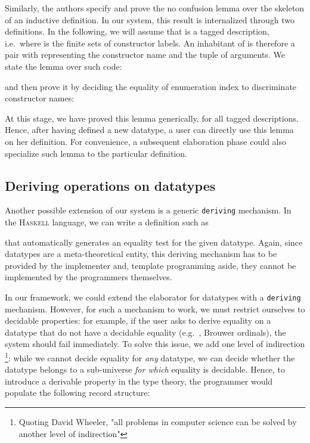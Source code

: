 \documentclass{scrartcl}
\theoremstyle{plain}
\theoremstyle{definition}
\newcommand{\ie}{i.e.\ }
\newcommand{\eg}{e.g.\ }
\begin{document}
Similarly, the authors specify and prove the no confusion lemma over
the skeleton of an inductive definition. In our system, this result is
internalized through two definitions. In the following, we will assume
that  is a tagged description, \ie  where  is the finite sets of constructor
labels. An inhabitant of  is therefore a pair
 with  representing the constructor name and
 the tuple of arguments. We state the  lemma over
such code:

and then prove it by deciding the equality of enumeration index to
discriminate constructor names:

At this stage, we have proved this lemma generically, for all tagged
descriptions. Hence, after having defined a new datatype, a user can
directly use this lemma on her definition. For convenience, a
subsequent elaboration phase could also specialize such lemma to the
particular definition.



\subsection{Deriving operations on datatypes}

Another possible extension of our system is a generic
\texttt{deriving} mechanism. In the \textsc{Haskell} language, we can
write a definition such as

that automatically generates an equality test for the given
datatype. Again, since datatypes are a meta-theoretical entity, this
deriving mechanism has to be provided by the implementer and, template
programming aside, they cannot be implemented by the programmers
themselves. 

\newcommand{\subDesc}{\CN{subDesc}}
\newcommand{\decideIn}{\CN{membership}}
\newcommand{\derive}{\CN{derive}}

In our framework, we could extend the elaborator for datatypes with a
\texttt{deriving} mechanism. However, for such a mechanism to work, we
must restrict ourselves to decidable properties: for example, if the
user asks to derive equality on a datatype that do not have a
decidable equality (\eg, Brouwer ordinals), the system should fail
immediately. To solve this issue, we add one level of
indirection \footnote{Quoting David Wheeler, "all problems in computer
  science can be solved by another level of indirection"}\fi: while we
cannot decide equality for \emph{any} datatype, we can decide whether
the datatype belongs to a sub-universe \emph{for which} equality is
decidable. Hence, to introduce a derivable property  in the type
theory, the programmer would populate the following record structure:
\end{document}
